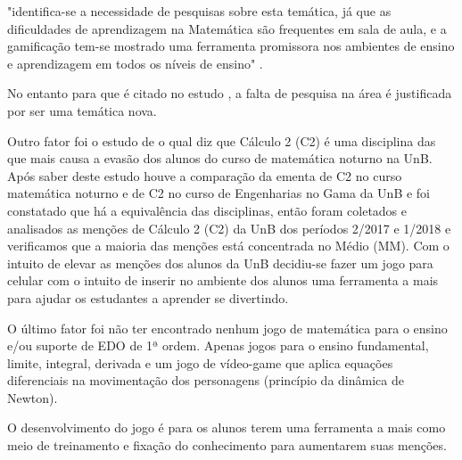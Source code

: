 \begin{citacao}"identifica-se a necessidade de pesquisas sobre esta temática, já que as dificuldades de aprendizagem na Matemática são frequentes em sala de aula, e a gamificação tem-se mostrado uma ferramenta promissora nos ambientes de ensino e aprendizagem em todos os níveis de ensino" \cite{revbibmatgam}. \end{citacao}




 No entanto para \cite{dicheva} que é citado no estudo \cite{revbibmatgam}, a falta de pesquisa na área é justificada por ser uma temática nova.

Outro fator foi o estudo de \cite{evasaoC2} o qual diz que Cálculo 2 (C2) é uma disciplina das que mais causa a evasão dos alunos do curso de matemática noturno na UnB. Após saber deste estudo houve a comparação da ementa de C2 no curso matemática noturno e de C2 no curso de Engenharias no Gama da UnB e foi constatado que há a equivalência das disciplinas, então foram coletados e analisados as menções de Cálculo 2 (C2) da UnB dos períodos 2/2017 e 1/2018 e verificamos que a maioria das menções está concentrada no Médio (MM). Com o intuito de elevar as menções dos alunos da UnB decidiu-se fazer um jogo para celular com o intuito de inserir no ambiente dos alunos uma ferramenta a mais para ajudar os estudantes a aprender se divertindo. 


O último fator foi não ter encontrado nenhum jogo de matemática para o ensino e/ou suporte de EDO de 1ª ordem. Apenas jogos para o ensino fundamental, limite, integral, derivada e um jogo de vídeo-game que aplica equações diferenciais na movimentação dos personagens (princípio da dinâmica de Newton)\cite{videoGameED}.

\begin{comment}
// //
O Brasil tem um dos piores índices de conhecimento em matemática \cite{indiceRuimMat}. Também tem o desânimo dos alunos e professores além da falta de estratégias inovadores por parte dos professores na hora de ensinar \cite{softwaregamificado}. Esse método de ensino tradicional, onde o professor é ativo e os alunos são apenas passivos para receber o conhecimento faz com que menos seja abstraído pelos alunos, que também precisam de práticas e um tempo de ócio criativo para abstrair e compreender o conteúdo de modo a repetir e aplicar em outras situações.
// //
\end{comment}
O desenvolvimento do jogo é para os alunos terem uma ferramenta a mais como meio de treinamento e fixação do conhecimento para aumentarem suas menções.

